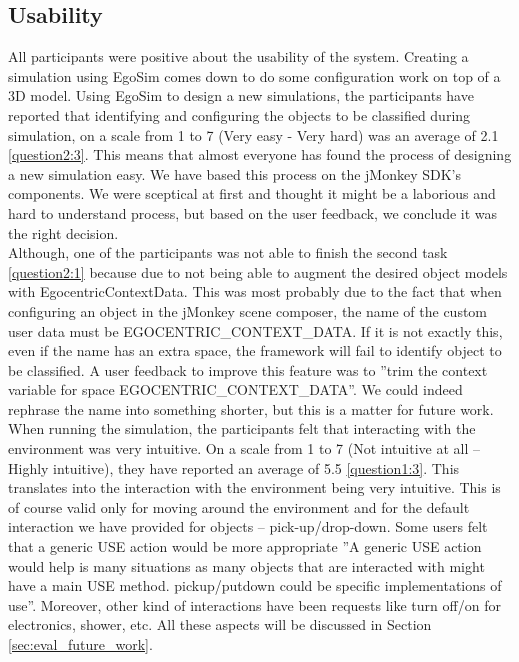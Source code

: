 \subsection{Usability} %
\label{sec:eval_usability}
All participants were positive about the usability of the system. Creating a simulation using EgoSim comes down to do some configuration work on top of a 3D model. Using EgoSim to design a new simulations, the participants have reported that identifying and configuring the objects to be classified during simulation, on a scale from 1 to 7 (Very easy - Very hard) was an average of 2.1 \ref{question2:3}. This means that almost everyone has found the process of designing a new simulation easy. We have based this process on the jMonkey SDK's components. We were sceptical at first and thought it might be a laborious and hard to understand process, but based on the user feedback, we conclude it was the right decision.\\

Although, one of the participants was not able to finish the second task \ref{question2:1} because due to not being able to augment the desired object models with EgocentricContextData. This was most probably due to the fact that when configuring an object in the jMonkey scene composer, the name of the custom user data must be EGOCENTRIC\_CONTEXT\_DATA. If it is not exactly this, even if the name has an extra space, the framework will fail to identify object to be classified. A user feedback to improve this feature was to ''trim the context variable for space EGOCENTRIC\_CONTEXT\_DATA''. We could indeed rephrase the name into something shorter, but this is a matter for future work.\\

When running the simulation, the participants felt that interacting with the environment was very intuitive. On a scale from 1 to 7 (Not intuitive at all -- Highly intuitive), they have reported an average of 5.5 \ref{question1:3}. This translates into the interaction with the environment being very intuitive. This is of course valid only for moving around the environment and for the default interaction we have provided for objects -- pick-up/drop-down. Some users felt that a generic USE action would be more appropriate ''A generic USE action would help is many situations as many objects that are interacted with might have a main USE method. pickup/putdown could be specific implementations of use''. Moreover, other kind of interactions have been requests like turn off/on for electronics, shower, etc. All these aspects will be discussed in Section \ref{sec:eval_future_work}.\\

